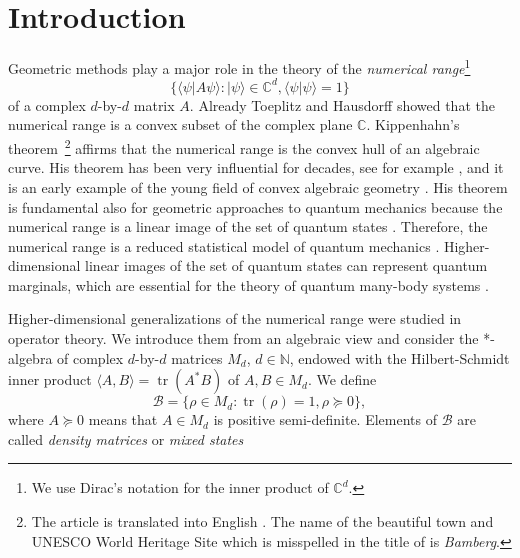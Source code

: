 \documentclass[12pt]{amsart}
\theoremstyle{definition}
\numberwithin{equation}{section}
\begin{document}
\section{Introduction}
\label{sec:intro}
\par
Geometric methods play a major role in the theory of the 
{\em numerical range}\footnote{We use Dirac's notation \cite{NielsenChuang2010} for the inner product 
of ${\mathbb C}^d$.}
\[
\{\langle\psi|A\psi\rangle :
|\psi\rangle\in{\mathbb C}^d, \langle \psi|\psi\rangle=1\}
\]
of a complex $d$-by-$d$ matrix $A$. Already Toeplitz and Hausdorff 
\cite{Toeplitz1918,Hausdorff1919} showed that the numerical range is a 
convex subset of the complex plane ${\mathbb C}$. Kippenhahn's theorem 
\cite{Kippenhahn1951}\,\footnote{The article \cite{Kippenhahn1951} is translated into English
\cite{ZachlinHochstenbach2008}. The name of the beautiful town and 
UNESCO World Heritage Site which is misspelled in the title of 
\cite{ZachlinHochstenbach2008} is {\em Bamberg}.}
affirms that the numerical range is the convex hull of an algebraic curve. 
His theorem has been very influential for decades, see for example 
\cite{Fiedler1981,Keeler-etal1997,JoswigStraub1998,Mirman1998, 
ChienNakazato1999,Bebiano-etal2005}, and it is an early example of the 
young field of convex algebraic geometry 
\cite{Blekherman-etal2013,Netzer2012,SinnSturmfels2015}. His theorem is
fundamental also for geometric approaches to quantum mechanics because 
the numerical range is a linear image of the set of quantum states 
\cite{BerberianOrland1967,Dunkl-etal2011}. Therefore, the numerical range 
is a reduced statistical model of quantum mechanics \cite{Holevo2011}. 
Higher-dimensional linear images of the set of quantum states can represent 
quantum marginals, which are essential for the theory of quantum many-body 
systems \cite{Coleman1963,Erdahl1972}.
\par
Higher-dimensional generalizations of the numerical range were studied in 
operator theory. We introduce them from an algebraic view and consider the 
*-algebra of complex $d$-by-$d$ matrices $M_d$, $d\in{\mathbb N}$, endowed with the 
Hilbert-Schmidt inner product $\langle A,B\rangle={\operatorname{tr}}(A^*B)$ of 
$A,B\in M_d$. We define  
\begin{equation}\label{eq:dm}
{\mathcal B}=\{\rho\in M_d : {\operatorname{tr}}(\rho)=1, \rho\succeq 0\},
\end{equation}
where $A\succeq 0$ means that $A\in M_d$ is positive semi-definite. Elements
of ${\mathcal B}$ are called {\em density matrices} or {\em mixed states}
\end{document}
